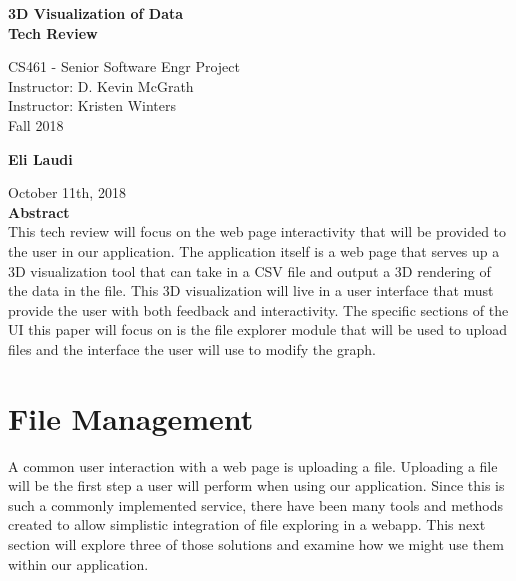 \documentclass[letterpaper,10pt,titlepage, onecolumn]{IEEEtran}
\begin{document}
\begin{titlepage}
\begin{center}
  
  \textbf{}

  \vspace{6cm}
  \Huge{}
  \textbf{3D Visualization of Data \\ Tech Review}
  \vspace{3cm}

 
  \LARGE
  CS461 - Senior Software Engr Project\\
  \vspace{0.25cm}
  Instructor: D. Kevin McGrath \\
  Instructor: Kristen Winters \\
  \vspace{0.25cm}
  Fall 2018 \\
  \vspace{1.5cm}
  
  \normalsize
  \textbf{Eli Laudi}
  \date{October 9th, 2018}
  \vfill
  October 11th, 2018\\
  \vspace{1cm}
  \vspace*{\fill}
  \textbf{Abstract} \\
  \normalsize
  This tech review will focus on the web page interactivity that will be provided to the user in our application. The application itself is a web page that serves up a 3D visualization tool that can take in a CSV file and output a 3D rendering of the data in the file. This 3D visualization will live in a user interface that must provide the user with both feedback and interactivity. The specific sections of the UI this paper will focus on is the file explorer module that will be used to upload files and the interface the user will use to modify the graph.
  \end{center}
  \end{titlepage}
  
\section{File Management}
A common user interaction with a web page is uploading a file. Uploading a file will be the first step a user will perform when using our application. Since this is such a commonly implemented service, there have been many tools and methods created to allow simplistic integration of file exploring in a webapp. This next section will explore three of those solutions and examine how we might use them within our application.
\end{document}
